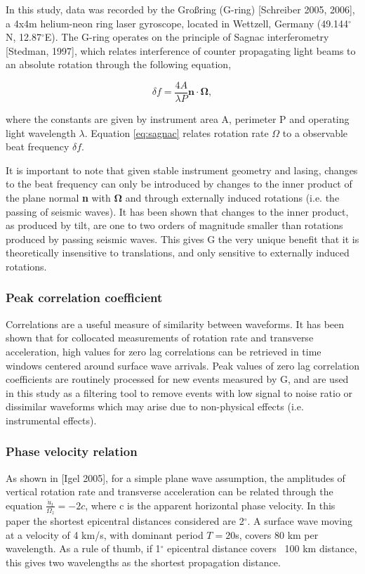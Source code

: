 \documentclass{gji}
\begin{document}
In this study, data was recorded by the Gro\ss ring (G-ring) [Schreiber 2005, 2006], a 4x4m helium-neon ring laser gyroscope, located in Wettzell, Germany (49.144$^\circ$N, 12.87$^\circ$E). The G-ring operates on the principle of Sagnac interferometry [Stedman, 1997], which relates interference of counter propagating light beams to an absolute rotation through the following equation, 

\begin{equation}\label{eq:sagnac}
	\delta f = \frac{4A}{\lambda P}\mathbf{n}\cdot \mathbf{\Omega},
\end{equation}

\noindent where the constants are given by instrument area A, perimeter P and operating light wavelength $\lambda$. Equation \ref{eq:sagnac} relates rotation rate $\Omega$ to a observable beat frequency $\delta f$. 

It is important to note that given stable instrument geometry and lasing, changes to the beat frequency can only be introduced by changes to the inner product of the plane normal {\bfseries n} with $\mathbf{\Omega}$ and through externally induced rotations (i.e. the passing of seismic waves). It has been shown that changes to the inner product, as produced by tilt, are one to two orders of magnitude smaller than rotations produced by passing seismic waves. This gives G the very unique benefit that it is theoretically insensitive to translations, and only sensitive to externally induced rotations.

\subsubsection{Peak correlation coefficient}
Correlations are a useful measure of similarity between waveforms. It has been shown that for collocated measurements of rotation rate and transverse acceleration, high values for zero lag correlations can be retrieved in time windows centered around surface wave arrivals. %
Peak values of zero lag correlation coefficients are routinely processed for new events measured by G, %
and are used in this study as a filtering tool to remove events with low signal to noise ratio or dissimilar waveforms which may arise due to non-physical effects (i.e. instrumental effects). 

\subsubsection{Phase velocity relation}\label{phasevel}
As shown in [Igel 2005], %
for a simple plane wave assumption, the amplitudes of vertical rotation rate and transverse acceleration can be related through the equation $\frac{\ddot{u}_t}{\Omega_z} = -2c$, where c is the apparent horizontal phase velocity. In this paper the shortest epicentral distances considered are 2$^\circ$. A surface wave moving at a velocity of 4 km/s, with dominant period $T=20$s, covers 80 km per wavelength. As a rule of thumb, if 1$^\circ$ epicentral distance covers ~100 km distance, this gives two wavelengths as the shortest propagation distance. 
\end{document}
